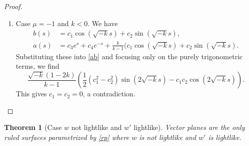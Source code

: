 \documentclass[a4paper,12pt]{amsart}
\newtheorem{theorem}{Theorem}[section]
\theoremstyle{definition}
\def\r{\mathbb R}
\begin{document}
\begin{proof}
\begin{enumerate}
\begin{enumerate}
\begin{enumerate}
\item Case $\mu=-1$ and $k<0$. We have 
\begin{equation*}
\begin{split}
b(s)&=c_1\cos (\sqrt{-k}s)+c_2 \sin(\sqrt{-k}s),\\
a(s) &= c_3 e^{s} + c_4 e^{-s}+ \frac{k}{k-1} ( c_1 \cos( \sqrt{-k} s )+c_2 \sin( \sqrt{-k}s ) .
\end{split}
\end{equation*}
Substituting these into \eqref{ab} and focusing only on the purely trigonometric terms, we find  
$$
\frac{\sqrt{-k}(1-2k)}{k-1} ( \frac12(c_{1}^2 - c_{2}^2) \sin(2 \sqrt{-k}s) - c_{1} c_{2} \cos(2 \sqrt{-k} s)).
$$
This gives $c_1=c_2=0$,  a contradiction.

\end{enumerate}
\end{enumerate}
\end{enumerate}
\end{proof}



 
  
\begin{theorem}[Case $w$ not lightlike and $w'$ lightlike] \label{th-nli2}
Vector planes are the only     ruled surfaces parametrized by \eqref{rp} where   $w$   is not lightlike and $w'$ is lightlike. 
\end{theorem}
\end{document}
